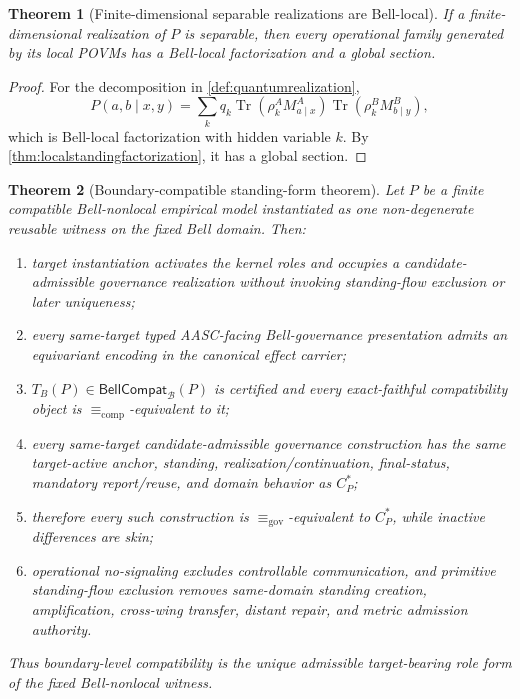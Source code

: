 \documentclass[11pt]{article}
\newtheorem{theorem}{Theorem}[section]
\theoremstyle{definition}
\newcommand{\Bell}{\mathcal{B}}
\newcommand{\GovEq}{\equiv_{\mathrm{gov}}}
\newcommand{\CompEq}{\equiv_{\mathrm{comp}}}
\newcommand{\BellCompat}{\mathsf{BellCompat}_{\Bell}(P)}
\newcommand{\CanonC}{C^{*}_{P}}
\begin{document}
\begin{theorem}[Finite-dimensional separable realizations are Bell-local]\label{thm:separablebelllocal}
If a finite-dimensional realization of $P$ is separable, then every operational family generated by its local POVMs has a Bell-local factorization and a global section.
\end{theorem}

\begin{proof}
For the decomposition in \cref{def:quantumrealization},
\[
P(a,b\mid x,y)=\sum_k q_k
\operatorname{Tr}(\rho^A_kM^A_{a\mid x})
\operatorname{Tr}(\rho^B_kM^B_{b\mid y}),
\]
which is Bell-local factorization with hidden variable $k$. By \cref{thm:localstandingfactorization}, it has a global section.
\end{proof}

\begin{theorem}[Boundary-compatible standing-form theorem]\label{thm:bellwitnessdet}
Let $P$ be a finite compatible Bell-nonlocal empirical model instantiated as one non-degenerate reusable witness on the fixed Bell domain. Then:
\begin{enumerate}[label=(\roman*),leftmargin=2em]
\item target instantiation activates the kernel roles and occupies a candidate-admissible governance realization without invoking standing-flow exclusion or later uniqueness;
\item every same-target typed AASC-facing Bell-governance presentation admits an equivariant encoding in the canonical effect carrier;
\item $T_B(P)\in\BellCompat$ is certified and every exact-faithful compatibility object is $\CompEq$-equivalent to it;
\item every same-target candidate-admissible governance construction has the same target-active anchor, standing, realization/continuation, final-status, mandatory report/reuse, and domain behavior as $\CanonC$;
\item therefore every such construction is $\GovEq$-equivalent to $\CanonC$, while inactive differences are skin;
\item operational no-signaling excludes controllable communication, and primitive standing-flow exclusion removes same-domain standing creation, amplification, cross-wing transfer, distant repair, and metric admission authority.
\end{enumerate}
Thus boundary-level compatibility is the unique admissible target-bearing role form of the fixed Bell-nonlocal witness.
\end{theorem}
\end{document}
